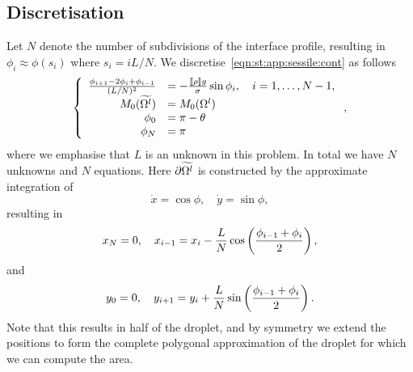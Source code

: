\subsection{Discretisation}
Let $N$ denote the number of subdivisions of the interface profile, resulting in $\phi_i \approx \phi(s_i)$ where $s_i = i L / N$.
We discretise~\cref{eqn:st:app:sessile:cont} as follows
\begin{equation}
  \left\lbrace\begin{array}{rl}
    \frac{\phi_{i+1} - 2\phi_{i} + \phi_{i-1}}{(L / N)^2} &= -\frac{\left\llbracket\rho\right\rrbracket g}{\sigma} \sin \phi_i, \quad i = 1, \ldots, N-1,\\
    M_0(\widetilde{\Omega^{l}}) &= M_0(\Omega^l)\\
    \phi_0 &= \pi - \theta\\
    \phi_{N} &= \pi
  \end{array}\right.,
\end{equation}
where we emphasise that $L$ is an unknown in this problem.
In total we have $N$ unknowns and $N$ equations.
Here $\partial\widetilde{\Omega^{l}}$ is constructed by the approximate integration of 
\begin{equation}
  \dot x = \cos \phi, \quad \dot y = \sin \phi,
\end{equation}
resulting in
\begin{equation}
  x_N = 0, \quad x_{i-1} = x_i - \frac{L}{N} \cos\left( \frac{\phi_{i-1} + \phi_i}{2} \right),
\end{equation}
and
\begin{equation}
  y_0 = 0, \quad y_{i+1} = y_i + \frac{L}{N} \sin\left( \frac{\phi_{i-1} + \phi_i}{2} \right).
\end{equation}
Note that this results in half of the droplet, and by symmetry we extend the positions to form the complete polygonal approximation of the droplet for which we can compute the area.